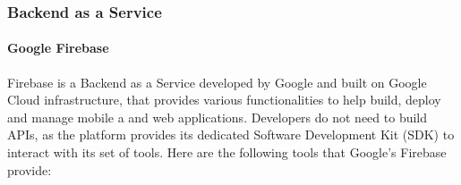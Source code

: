 \subsubsection{Backend as a Service}

\paragraph{Google Firebase}

Firebase is a Backend as a Service developed by Google and built on Google Cloud infrastructure,  that provides various functionalities to help build, deploy and manage mobile a and web applications.
Developers do not need to build APIs, as the platform provides its dedicated Software Development Kit (SDK) to interact with its set of tools.
Here are the following tools that Google's Firebase provide:

